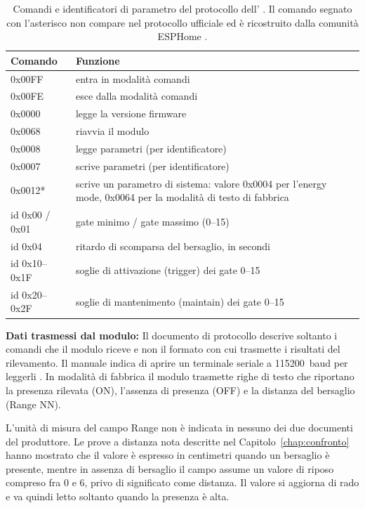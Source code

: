 \begin{table}[!htb]
\centering
\caption{Comandi e identificatori di parametro del protocollo dell'\ldc{} \cite{hilinkProtoLD2420}. Il comando segnato con l'asterisco non compare nel protocollo ufficiale ed è ricostruito dalla comunità ESPHome \cite{esphomeLD2420src}.}
\label{tab:c3-9}
\small
\begin{tabularx}{\linewidth}{@{}lX@{}}
\toprule
\textbf{Comando} & \textbf{Funzione} \\
\midrule
0x00FF & entra in modalità comandi \\
0x00FE & esce dalla modalità comandi \\
0x0000 & legge la versione firmware \\
0x0068 & riavvia il modulo \\
0x0008 & legge parametri (per identificatore) \\
0x0007 & scrive parametri (per identificatore) \\
0x0012* & scrive un parametro di sistema: valore 0x0004 per l'energy mode, 0x0064 per la modalità di testo di fabbrica \\
id 0x00 / 0x01 & gate minimo / gate massimo (0–15) \\
id 0x04 & ritardo di scomparsa del bersaglio, in secondi \\
id 0x10–0x1F & soglie di attivazione (trigger) dei gate 0–15 \\
id 0x20–0x2F & soglie di mantenimento (maintain) dei gate 0–15 \\
\bottomrule
\end{tabularx}
\end{table}

\textbf{Dati trasmessi dal modulo:} Il documento di protocollo descrive soltanto i comandi che il modulo riceve e non il formato con cui trasmette i risultati del rilevamento. Il manuale indica di aprire un terminale seriale a 115200~baud per leggerli \cite[§4.1]{hilinkManualLD2420}. In modalità di fabbrica il modulo trasmette righe di testo che riportano la presenza rilevata (ON), l'assenza di presenza (OFF) e la distanza del bersaglio (Range NN).

L'unità di misura del campo Range non è indicata in nessuno dei due documenti del produttore. Le prove a distanza nota descritte nel Capitolo~\ref{chap:confronto} hanno mostrato che il valore è espresso in centimetri quando un bersaglio è presente, mentre in assenza di bersaglio il campo assume un valore di riposo compreso fra 0 e 6, privo di significato come distanza. Il valore si aggiorna di rado e va quindi letto soltanto quando la presenza è alta.

